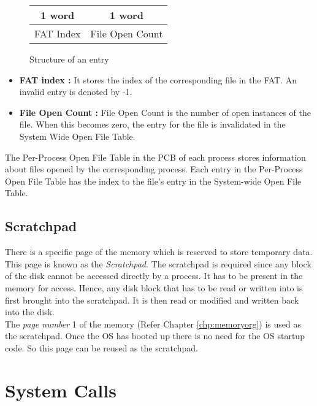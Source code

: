 \documentclass[10pt]{report}
\begin{document}
	 \begin{figure}[h!]
		 \centering
			\begin{tabular}{|c|c|}
				1 word & 1 word	\\		
				\hline
				FAT Index & File Open Count\\
				\hline
			\end{tabular}
		 \caption{Structure of an entry}
		 \label{fig:file table}
	 \end{figure}

	 \begin{itemize}
		 \item \textbf{FAT index :}  It stores the index of the corresponding file in the FAT. An invalid entry is denoted by -1.

		 \item \textbf{File Open Count :} File Open Count is the number of open instances of the file. When this becomes zero, the entry for the file is invalidated in the System Wide Open File Table.
	 \end{itemize}

The Per-Process Open File Table in the PCB of each process stores information about files opened by the corresponding process. Each entry in the Per-Process Open File Table has the index to the file’s entry in the System-wide Open File Table.

\section{Scratchpad}
\label{sec:scratchpad}
There is a specific page of the memory which is reserved to store temporary data. This page is known as the \textit{Scratchpad}. The scratchpad is required since any block of the disk cannot be accessed directly  by a process. It has to be present in the memory for access. Hence, any disk block that has to be read or written into is first brought into the scratchpad. It is then read or modified and written back into the disk. \\

The \textit{page number} 1 of the memory (Refer Chapter \ref{chp:memoryorg}) is used as the scratchpad. Once the OS has booted up there is no need for the OS startup code. So this page can be reused as the scratchpad.


\chapter{System Calls}
\label{chp:system_calls}
\end{document}

